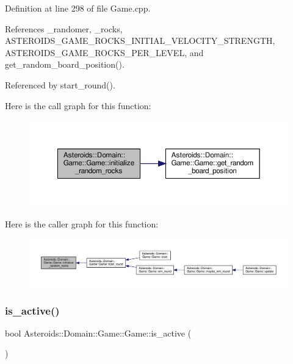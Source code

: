 Definition at line 298 of file Game.\+cpp.



References \+\_\+randomer, \+\_\+rocks, A\+S\+T\+E\+R\+O\+I\+D\+S\+\_\+\+G\+A\+M\+E\+\_\+\+R\+O\+C\+K\+S\+\_\+\+I\+N\+I\+T\+I\+A\+L\+\_\+\+V\+E\+L\+O\+C\+I\+T\+Y\+\_\+\+S\+T\+R\+E\+N\+G\+TH, A\+S\+T\+E\+R\+O\+I\+D\+S\+\_\+\+G\+A\+M\+E\+\_\+\+R\+O\+C\+K\+S\+\_\+\+P\+E\+R\+\_\+\+L\+E\+V\+EL, and get\+\_\+random\+\_\+board\+\_\+position().



Referenced by start\+\_\+round().

Here is the call graph for this function\+:\nopagebreak
\begin{figure}[H]
\begin{center}
\leavevmode
\includegraphics[width=350pt]{classAsteroids_1_1Domain_1_1Game_1_1Game_ad3a7040e8cc0b14228f46577ecf2bc78_cgraph}
\end{center}
\end{figure}
Here is the caller graph for this function\+:\nopagebreak
\begin{figure}[H]
\begin{center}
\leavevmode
\includegraphics[width=350pt]{classAsteroids_1_1Domain_1_1Game_1_1Game_ad3a7040e8cc0b14228f46577ecf2bc78_icgraph}
\end{center}
\end{figure}
\mbox{\label{classAsteroids_1_1Domain_1_1Game_1_1Game_a29d018d13b934b31e4192758422fea68}} 
\subsubsection{\texorpdfstring{is\+\_\+active()}{is\_active()}}
{\footnotesize\ttfamily bool Asteroids\+::\+Domain\+::\+Game\+::\+Game\+::is\+\_\+active (\begin{DoxyParamCaption}{ }\end{DoxyParamCaption})\hspace{0.3cm}{\ttfamily [virtual]}}




